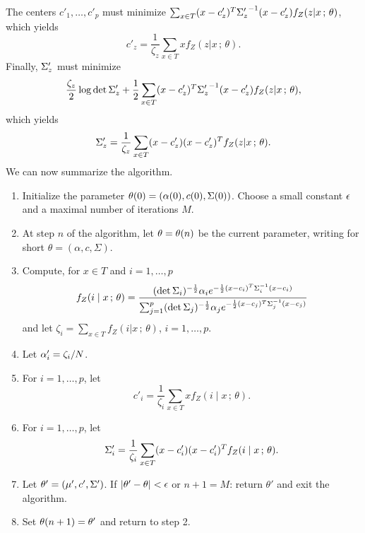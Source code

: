 The centers $c'_1, \ldots, c'_p$ must minimize $\sum_{x\in T} (x-c'_z)^T{\Sigma'_z}^{-1}
(x-c'_z)f_Z(z|x\,;\,\theta)$, which yields
\[
c'_z = \frac{1}{\zeta_z}\sum_{x\in T} x f_Z(z|x\,;\,\theta).
\]
Finally, $\Sigma'_z$ must minimize
\[
\frac{\zeta_z}{2}
\log\det\Sigma'_z  + \frac12   \sum_{x\in T} (x-c'_z)^T{\Sigma'_z}^{-1} (x-c'_z) f_Z(z|x\,;\,\theta),
\]
which yields
\[
\Sigma'_z = \frac{1}{\zeta_z} \sum_{x\in T} (x - c'_z)(x-c'_z)^T f_Z(z|x\,;\,\theta).
\]
We can now summarize the algorithm.
\begin{algorithm}
\label{alg:mix.gauss}
\begin{enumerate}[label=\arabic*., wide=0.5cm]
\item Initialize the  parameter $\theta(0) = (\alpha(0), c(0), \Sigma(0))$. Choose a small constant $\epsilon$ and a maximal number of iterations $M$.
\item At step $n$ of the algorithm, let $\theta = \theta(n)$ be the current parameter, writing for short $\theta = (\alpha, c, \Sigma)$. 
\item Compute, for $x\in T$ and $i=1, \ldots, p$
\[
f_Z(i\mid x\,;\,\theta) = \frac{(\det \Sigma_i)^{-\frac12} \alpha_i e^{- \frac12
(x-c_i)^T\Sigma_i^{-1} (x-c_i)}}{\sum_{j=1}^p (\det \Sigma_j)^{-\frac12} \alpha_j e^{-\frac12
(x-c_j)^T\Sigma_j^{-1} (x-c_j)}}
\]
and let $\zeta_i = \sum_{x\in T} f_Z(i|x\,;\,\theta)$, $i=1, \ldots, p$.
\item Let $\alpha'_i = \zeta_i/N$.
\item For $i=1, \ldots, p$, let 
\[
c'_i = \frac{1}{\zeta_i}\sum_{x\in T} x f_Z(i\mid x\,;\,\theta).
\]
\item For $i=1, \ldots, p$, let 
\[
\Sigma'_i = \frac{1}{\zeta_i} \sum_{x\in T} (x - c'_i)(x-c'_i)^T f_Z(i\mid x\,;\,\theta).
\]
\item Let $\theta' = (\mu', c', \Sigma')$. If $|\theta' - \theta| <\epsilon$ or $n+1=M$: return $\theta'$ and exit the algorithm.
\item Set $\theta(n+1)=\theta'$ and return to step 2. 
\end{enumerate}
\end{algorithm}

